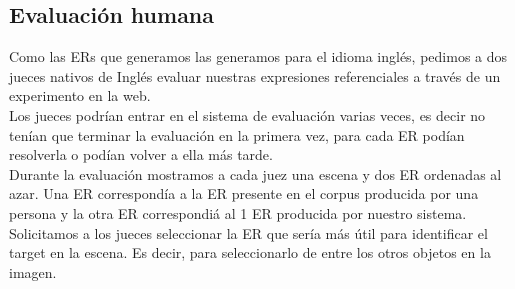  

\subsection{Evaluaci\'on humana} \label{sec:humanevaluation}




Como las ERs que generamos las generamos para el idioma ingl\'es, pedimos a dos jueces nativos de Ingl\'es evaluar nuestras expresiones referenciales a trav\'es de un experimento en la web. \\

Los jueces podr\'{i}an entrar en el sistema de evaluaci\'on varias veces, es decir no ten\'ian que terminar la evaluaci\'on en la primera vez, para cada ER pod\'ian resolverla o pod\'ian volver a ella m\'as tarde. \\

Durante la evaluaci\'on mostramos a cada juez una escena y dos ER ordenadas al azar. Una ER correspond\'ia a la ER presente en el corpus producida por una persona y la otra ER correspondi\'a al 1 ER producida por nuestro sistema. Solicitamos a los jueces seleccionar la ER que ser\'{i}a m\'as \'util para identificar el target en la escena. Es decir, para seleccionarlo de entre los otros objetos en la imagen.\\


